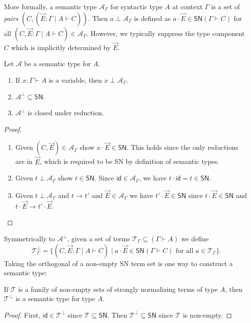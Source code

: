 \documentclass[a4paper,USenglish,cleveref, autoref, thm-restate]{lipics-v2019}
\newcommand{\bla}{\ensuremath{\mbox{$$}}}
\newcommand{\tid}{\mathsf{id}}
\newcommand{\red}[1][]{\longrightarrow_{#1}}
\newcommand{\A}{\mathcal{A}}
\newcommand{\T}{\mathcal{T}}
\newcommand{\SN}{\mathsf{SN}}
\begin{document}
More formally, a semantic type $\A_\Gamma$ for syntactic type $A$ at
context $\Gamma$ is a set of \emph{pairs}
$(C, (\vec E : \Gamma \mid A \vdash C))$.
Then $a \perp \A_\Gamma$ is defined as
$a \cdot \vec E \in \SN(\Gamma \vdash C)$
for all $(C, \vec E : \Gamma \mid A \vdash C) \in \A_\Gamma$.
However, we typically
suppress the type component $C$ which is implicitly determined by
$\vec E$.
\begin{lemma}
  Let $\A$ be a semantic type for $A$.
  \begin{enumerate}
  \item If $x : \Gamma \vdash A$ is a variable, then $x \perp
    \A_\Gamma$.
  \item $\A^\perp \subseteq \SN$.
  \item $\A^\perp$ is closed under reduction.
  \end{enumerate}
\end{lemma}
\begin{proof} \bla
  \begin{enumerate}
  \item Given $(C, \vec E) \in \A_\Gamma$ show $x \cdot \vec E \in
    \SN$.  This holds since the only reductions are in $\vec E$, which
    is required to be SN by definition of semantic types.

  \item Given $t \perp \A_\Gamma$ show $t \in \SN$.
   Since $\tid \in \A_\Gamma$, we have $t \cdot \tid = t \in \SN$.

  \item Given $t \perp \A_\Gamma$ and $t \red t'$ and $\vec E \in \A_\Gamma$ we
    have $t' \cdot \vec E \in \SN$ since $t \cdot \vec E \in \SN$ and
    $t \cdot \vec E \red t' \cdot \vec E$.
  \popQED
  \end{enumerate}
\end{proof}

\noindent
Symmetrically to $\A^\perp$, given a set of terms $\T_\Gamma \subseteq
(\Gamma \vdash A)$ we define
\[
  \T_\Gamma^\perp =
  \{ (C, \vec E : \Gamma \mid A \vdash C) \mid
  a \cdot \vec E \in \SN(\Gamma \vdash C)
  \mbox{ for all } a \in \T_\Gamma \}
  .
\]
Taking the orthogonal of a non-empty SN term set is one way to
construct a semantic type:
\begin{lemma}
  \label{lem:orthsem}
  If $\T$ is a family of non-empty sets of strongly normalizing terms
  of type $A$, then
  $\T^\perp$ is a semantic type for type $A$.
\end{lemma}
\begin{proof}
  First, $\tid \in \T^\perp$ since $\T \subseteq \SN$.
  Then $\T^\perp \subseteq \SN$ since $\T$ is non-empty.
\end{proof}
\end{document}

